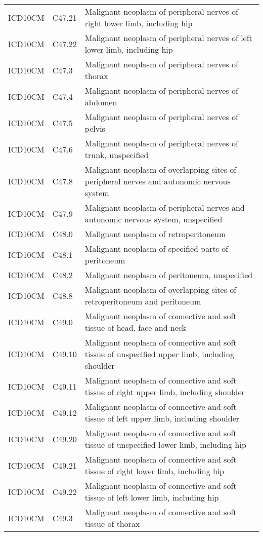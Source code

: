 \begin{longtable}{p{}p{}p{}}
  ICD10CM & C47.21 & Malignant neoplasm of peripheral nerves of right lower limb, including hip \\ 
  ICD10CM & C47.22 & Malignant neoplasm of peripheral nerves of left lower limb, including hip \\ 
  ICD10CM & C47.3 & Malignant neoplasm of peripheral nerves of thorax \\ 
  ICD10CM & C47.4 & Malignant neoplasm of peripheral nerves of abdomen \\ 
  ICD10CM & C47.5 & Malignant neoplasm of peripheral nerves of pelvis \\ 
  ICD10CM & C47.6 & Malignant neoplasm of peripheral nerves of trunk, unspecified \\ 
  ICD10CM & C47.8 & Malignant neoplasm of overlapping sites of peripheral nerves and autonomic nervous system \\ 
  ICD10CM & C47.9 & Malignant neoplasm of peripheral nerves and autonomic nervous system, unspecified \\ 
  ICD10CM & C48.0 & Malignant neoplasm of retroperitoneum \\ 
  ICD10CM & C48.1 & Malignant neoplasm of specified parts of peritoneum \\ 
  ICD10CM & C48.2 & Malignant neoplasm of peritoneum, unspecified \\ 
  ICD10CM & C48.8 & Malignant neoplasm of overlapping sites of retroperitoneum and peritoneum \\ 
  ICD10CM & C49.0 & Malignant neoplasm of connective and soft tissue of head, face and neck \\ 
  ICD10CM & C49.10 & Malignant neoplasm of connective and soft tissue of unspecified upper limb, including shoulder \\ 
  ICD10CM & C49.11 & Malignant neoplasm of connective and soft tissue of right upper limb, including shoulder \\ 
  ICD10CM & C49.12 & Malignant neoplasm of connective and soft tissue of left upper limb, including shoulder \\ 
  ICD10CM & C49.20 & Malignant neoplasm of connective and soft tissue of unspecified lower limb, including hip \\ 
  ICD10CM & C49.21 & Malignant neoplasm of connective and soft tissue of right lower limb, including hip \\ 
  ICD10CM & C49.22 & Malignant neoplasm of connective and soft tissue of left lower limb, including hip \\ 
  ICD10CM & C49.3 & Malignant neoplasm of connective and soft tissue of thorax \\ 

\end{longtable}
